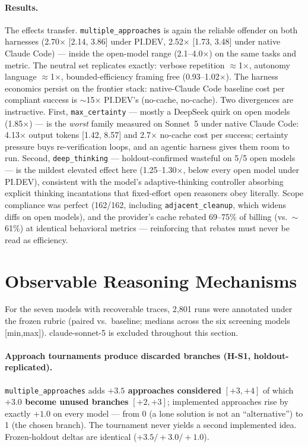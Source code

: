 \documentclass[11pt]{article}
\newcommand{\pidev}{PI.DEV}
\newcommand{\cc}{Claude Code}
\newcommand{\xd}{$\times$}
\begin{document}
\paragraph{Results.} The effects transfer. \texttt{multiple\_approaches}
is again the reliable offender on both harnesses (2.70\xd{} [2.14, 3.86]
under \pidev, 2.52\xd{} [1.73, 3.48] under native \cc) --- inside the
open-model range (2.1--4.0\xd) on the same tasks and metric. The neutral
set replicates exactly: verbose repetition $\approx$1\xd, autonomy
language $\approx$1\xd, bounded-efficiency framing free (0.93--1.02\xd).
The harness economics persist on the frontier stack: native-\cc{} baseline
cost per compliant success is $\sim$15\xd{} \pidev's (no-cache,
no-cache). Two divergences are instructive. First,
\texttt{max\_certainty} --- mostly a DeepSeek quirk on open models
(1.85\xd) --- is the \emph{worst} family measured on Sonnet~5 under native
\cc: 4.13\xd{} output tokens [1.42, 8.57] and 2.7\xd{} no-cache cost per
success; certainty pressure buys re-verification loops, and an agentic
harness gives them room to run. Second, \texttt{deep\_thinking} ---
holdout-confirmed wasteful on 5/5 open models --- is the mildest elevated
effect here (1.25--1.30\xd, below every open model under \pidev),
consistent with the model's adaptive-thinking controller absorbing
explicit thinking incantations that fixed-effort open reasoners obey
literally. Scope compliance was perfect (162/162, including
\texttt{adjacent\_cleanup}, which widens diffs on open models), and the
provider's cache rebated 69--75\% of billing (vs.\ $\sim$61\%) at
identical behavioral metrics --- reinforcing that rebates must never be
read as efficiency.

\section{Observable Reasoning Mechanisms}
\label{sec:semantic}

For the seven models with recoverable traces, 2{,}801 runs were annotated
under the frozen rubric (paired vs.\ baseline; medians across the six
screening models [min,max]). claude-sonnet-5 is excluded throughout this
section.

\paragraph{Approach tournaments produce discarded branches (H-S1,
holdout-replicated).} \texttt{multiple\_approaches} adds \textbf{$+3.5$
approaches considered} $[+3,+4]$ of which \textbf{$+3.0$ become unused
branches} $[+2,+3]$; implemented approaches rise by exactly $+1.0$ on
every model --- from 0 (a lone solution is not an ``alternative'') to 1
(the chosen branch). The tournament never yields a second implemented
idea. Frozen-holdout deltas are identical ($+3.5/+3.0/+1.0$).
\end{document}
